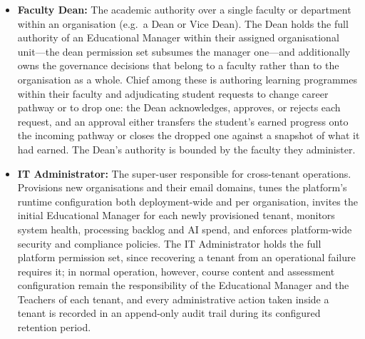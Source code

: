 \begin{itemize}
    \item \textbf{Faculty Dean:} The academic authority over a single
    faculty or department within an organisation (e.g.\ a Dean or Vice
    Dean). The Dean holds the full authority of an Educational Manager
    within their assigned organisational unit---the dean permission
    set subsumes the manager one---and additionally owns the
    governance decisions that belong to a faculty rather than to the
    organisation as a whole. Chief among these is authoring learning
    programmes within their faculty and adjudicating student requests
    to change career pathway or to drop one: the Dean acknowledges,
    approves, or rejects each request, and an approval either transfers
    the student's earned progress onto the incoming pathway or closes
    the dropped one against a snapshot of what it had earned. The
    Dean's authority is bounded by the faculty they administer.
 
    \item \textbf{IT Administrator:} The
    super-user responsible for cross-tenant operations. Provisions
    new organisations and their email domains, tunes the platform's
    runtime configuration both deployment-wide and per organisation,
    invites the initial Educational Manager for each newly
    provisioned tenant, monitors system health, processing backlog
    and AI spend, and enforces platform-wide security and compliance
    policies. The IT Administrator holds the full platform permission
    set, since recovering a tenant from an operational failure
    requires it; in normal operation, however, course content and
    assessment configuration remain the responsibility of the
    Educational Manager and the Teachers of each tenant, and every
    administrative action taken inside a tenant is recorded in an
    append-only audit trail during its configured retention period.
\end{itemize}